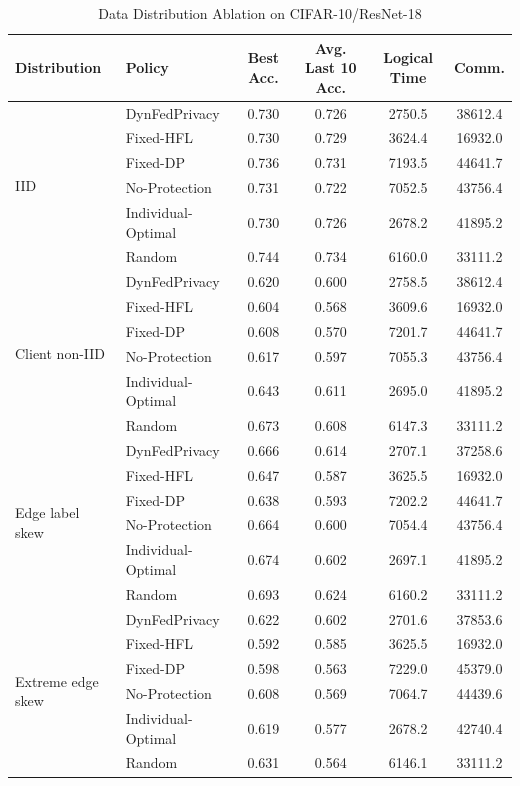 ﻿\documentclass[preprint,12pt]{elsarticle}
\theoremstyle{plain}
\theoremstyle{definition}
\theoremstyle{remark}
\newcommand{\method}{DynFedPrivacy}
\begin{document}
\begin{table}[t]
\centering
\caption{Data Distribution Ablation on CIFAR-10/ResNet-18}
\label{tab:data_distribution_ablation}
\begin{tabular}{llcccc}
\hline
\textbf{Distribution} & \textbf{Policy} & \textbf{Best Acc.} & \textbf{Avg. Last 10 Acc.} & \textbf{Logical Time} & \textbf{Comm.} \\
\hline
\multirow{6}{*}{IID}
 & \method{} & 0.730 & 0.726 & 2750.5 & 38612.4 \\
 & Fixed-HFL & 0.730 & 0.729 & 3624.4 & 16932.0 \\
 & Fixed-DP & 0.736 & 0.731 & 7193.5 & 44641.7 \\
 & No-Protection & 0.731 & 0.722 & 7052.5 & 43756.4 \\
 & Individual-Optimal & 0.730 & 0.726 & 2678.2 & 41895.2 \\
 & Random & 0.744 & 0.734 & 6160.0 & 33111.2 \\
\midrule
\multirow{6}{*}{Client non-IID}
 & \method{} & 0.620 & 0.600 & 2758.5 & 38612.4 \\
 & Fixed-HFL & 0.604 & 0.568 & 3609.6 & 16932.0 \\
 & Fixed-DP & 0.608 & 0.570 & 7201.7 & 44641.7 \\
 & No-Protection & 0.617 & 0.597 & 7055.3 & 43756.4 \\
 & Individual-Optimal & 0.643 & 0.611 & 2695.0 & 41895.2 \\
 & Random & 0.673 & 0.608 & 6147.3 & 33111.2 \\
\midrule
\multirow{6}{*}{Edge label skew}
 & \method{} & 0.666 & 0.614 & 2707.1 & 37258.6 \\
 & Fixed-HFL & 0.647 & 0.587 & 3625.5 & 16932.0 \\
 & Fixed-DP & 0.638 & 0.593 & 7202.2 & 44641.7 \\
 & No-Protection & 0.664 & 0.600 & 7054.4 & 43756.4 \\
 & Individual-Optimal & 0.674 & 0.602 & 2697.1 & 41895.2 \\
 & Random & 0.693 & 0.624 & 6160.2 & 33111.2 \\
\midrule
\multirow{6}{*}{Extreme edge skew}
 & \method{} & 0.622 & 0.602 & 2701.6 & 37853.6 \\
 & Fixed-HFL & 0.592 & 0.585 & 3625.5 & 16932.0 \\
 & Fixed-DP & 0.598 & 0.563 & 7229.0 & 45379.0 \\
 & No-Protection & 0.608 & 0.569 & 7064.7 & 44439.6 \\
 & Individual-Optimal & 0.619 & 0.577 & 2678.2 & 42740.4 \\
 & Random & 0.631 & 0.564 & 6146.1 & 33111.2 \\
\hline
\end{tabular}
\end{table}
\end{document}
